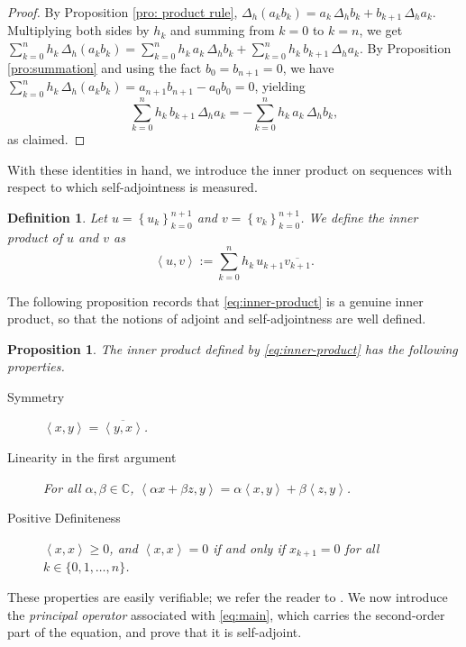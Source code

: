 \documentclass[12pt,reqno]{amsart}
\newtheorem{defi}[thm]{Definition}
\newtheorem{pro}[thm]{Proposition}
\numberwithin{equation}{section}
\begin{document}
\begin{proof}
By Proposition \ref{pro: product rule}, $\Delta_h(a_k b_k) = a_k\, \Delta_h b_k + b_{k+1}\, \Delta_h a_k.$ Multiplying both sides by $h_k$ and summing from $k = 0$ to $k=n$, we get $\displaystyle \sum_{k=0}^{n} h_k\, \Delta_h(a_k b_k) = \displaystyle \sum_{k=0}^{n} h_k\, a_k\, \Delta_h b_k + \sum_{k=0}^{n} h_k\, b_{k+1}\, \Delta_h a_k.$
By Proposition \ref{pro:summation} and using the fact $b_0 = b_{n+1} = 0$, we have $\displaystyle\sum_{k=0}^{n} h_k\, \Delta_h(a_k b_k) = a_{n+1}b_{n+1} - a_0 b_0=0$, yielding
\[
\sum_{k=0}^{n} h_k\, b_{k+1}\, \Delta_h a_k = -\sum_{k=0}^{n} h_k\, a_k\, \Delta_h b_k,
\]
as claimed.
\end{proof}

With these identities in hand, we introduce the inner product on sequences with respect to which self-adjointness is measured.

\begin{defi}
Let $u=\left\{u_k\right\}_{k=0}^{n+1}$ and $v=\left\{v_k\right\}_{k=0}^{n+1}$. We define the \emph{inner product} of $u$ and $v$ as
\begin{equation}
\label{eq:inner-product}
\left\langle u,v\right\rangle := \sum_{k=0}^{n} h_k\, u_{k+1} \overline{v_{k+1}}.
\end{equation}
\end{defi}

The following proposition records that \eqref{eq:inner-product} is a genuine inner product, so that the notions of adjoint and self-adjointness are well defined.

\begin{pro}
The inner product defined by \eqref{eq:inner-product} has the following properties.
\begin{description}
    \item[Symmetry] $\left\langle x,y\right\rangle=\overline{\left\langle y,x\right\rangle}$.
    \item[Linearity in the first argument] For all \(\alpha,\beta\in\mathbb{C}\), $\left\langle\alpha x+\beta z, y\right\rangle=\alpha\left\langle x,y\right\rangle+\beta\left\langle z,y\right\rangle$.
    \item[Positive Definiteness] $\left\langle x,x\right\rangle\geq0$, and $\left\langle x,x\right\rangle= 0$ if and only if $x_{k+1}=0$ for all $k \in \{0,1,\dots,n\}$.
\end{description}
\end{pro}

These properties are easily verifiable; we refer the reader to \cite[Pg. 282, Def. 7.4]{Book KP}. We now introduce the \emph{principal operator} associated with \eqref{eq:main}, which carries the second-order part of the equation, and prove that it is self-adjoint.
\end{document}
